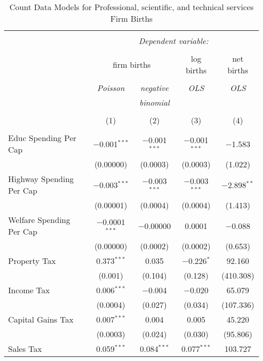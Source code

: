 
\begin{table}[!htbp] \centering 
  \caption{Count Data Models for Professional, scientific, and technical services Firm Births} 
  \label{} 
\begin{tabular}{@{\extracolsep{5pt}}lcccc} 
\\[-1.8ex]\hline 
\hline \\[-1.8ex] 
 & \multicolumn{4}{c}{\textit{Dependent variable:}} \\ 
\cline{2-5} 
\\[-1.8ex] & \multicolumn{2}{c}{firm births} & log births & net births \\ 
\\[-1.8ex] & \textit{Poisson} & \textit{negative} & \textit{OLS} & \textit{OLS} \\ 
 & \textit{} & \textit{binomial} & \textit{} & \textit{} \\ 
\\[-1.8ex] & (1) & (2) & (3) & (4)\\ 
\hline \\[-1.8ex] 
 Educ Spending Per Cap & $-$0.001$^{***}$ & $-$0.001$^{***}$ & $-$0.001$^{***}$ & $-$1.583 \\ 
  & (0.00000) & (0.0003) & (0.0003) & (1.022) \\ 
  Highway Spending Per Cap  & $-$0.003$^{***}$ & $-$0.003$^{***}$ & $-$0.003$^{***}$ & $-$2.898$^{**}$ \\ 
  & (0.00001) & (0.0004) & (0.0004) & (1.413) \\ 
  Welfare Spending Per Cap  & $-$0.0001$^{***}$ & $-$0.00000 & 0.0001 & $-$0.088 \\ 
  & (0.00000) & (0.0002) & (0.0002) & (0.653) \\ 
  Property Tax & 0.373$^{***}$ & 0.035 & $-$0.226$^{*}$ & 92.160 \\ 
  & (0.001) & (0.104) & (0.128) & (410.308) \\ 
  Income Tax & 0.006$^{***}$ & $-$0.004 & $-$0.020 & 65.079 \\ 
  & (0.0004) & (0.027) & (0.034) & (107.336) \\ 
  Capital Gains Tax & 0.007$^{***}$ & 0.004 & 0.005 & 45.220 \\ 
  & (0.0003) & (0.024) & (0.030) & (95.806) \\ 
  Sales Tax & 0.059$^{***}$ & 0.084$^{***}$ & 0.077$^{***}$ & 103.727 \\ 

\end{tabular}
\end{table}

